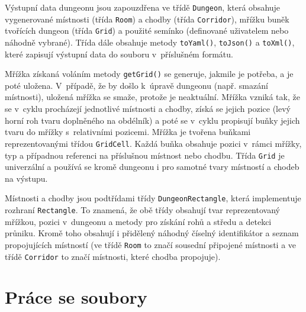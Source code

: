 Výstupní data dungeonu jsou zapouzdřena ve třídě \texttt{Dungeon}, která obsahuje vygenerované místnosti (třída \texttt{Room}) a chodby (třída \texttt{Corridor}), mřížku buněk tvořících dungeon (třída \texttt{Grid}) a použité semínko (definované uživatelem nebo náhodně vybrané).
Třída dále obsahuje metody \texttt{toYaml()}, \texttt{toJson()} a \texttt{toXml()}, které zapisují výstupní data do souboru v~příslušném formátu.
\par
Mřížka získaná voláním metody \texttt{getGrid()} se generuje, jakmile je potřeba, a je poté uložena.
V~případě, že by došlo k~úpravě dungeonu (např. smazání místnosti), uložená mřížka se smaže, protože je neaktuální.
Mřížka vzniká tak, že se v~cyklu procházejí jednotlivé místnosti a chodby, získá se jejich pozice (levý horní roh tvaru doplněného na obdélník) a poté se v~cyklu propisují buňky jejich tvaru do mřížky s~relativními pozicemi.
Mřížka je tvořena buňkami reprezentovanými třídou \texttt{GridCell}.
Každá buňka obsahuje pozici v~rámci mřížky, typ a případnou referenci na příslušnou místnost nebo chodbu.
Třída \texttt{Grid} je univerzální a používá se kromě dungeonu i pro samotné tvary místností a chodeb na výstupu.
\par
Místnosti a chodby jsou podtřídami třídy \texttt{DungeonRectangle}, která implementuje rozhraní \texttt{Rectangle}.
To znamená, že obě třídy obsahují tvar reprezentovaný mřížkou, pozici v~dungeonu a metody pro získání rohů a středu a detekci průniku.
Kromě toho obsahují i přidělený náhodný číselný identifikátor a seznam propojujících místností (ve třídě \texttt{Room} to značí sousední připojené místnosti a ve třídě \texttt{Corridor} to značí místnosti, které chodba propojuje).


\section{Práce se soubory}



